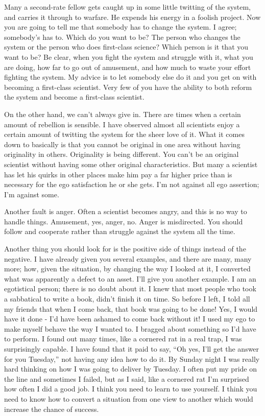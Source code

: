 \documentclass{article}
\begin{document}
Many a second-rate fellow gets caught up in some little twitting of the system, and carries it through to warfare. He expends his energy in a foolish project. Now you are going to tell me that somebody has to change the system. I agree; somebody's has to. Which do you want to be? The person who changes the system or the person who does first-class science? Which person is it that you want to be? Be clear, when you fight the system and struggle with it, what you are doing, how far to go out of amusement, and how much to waste your effort fighting the system. My advice is to let somebody else do it and you get on with becoming a first-class scientist. Very few of you have the ability to both reform the system and become a first-class scientist.

On the other hand, we can't always give in. There are times when a certain amount of rebellion is sensible. I have observed almost all scientists enjoy a certain amount of twitting the system for the sheer love of it. What it comes down to basically is that you cannot be original in one area without having originality in others. Originality is being different. You can't be an original scientist without having some other original characteristics. But many a scientist has let his quirks in other places make him pay a far higher price than is necessary for the ego satisfaction he or she gets. I'm not against all ego assertion; I'm against some.

Another fault is anger. Often a scientist becomes angry, and this is no way to handle things. Amusement, yes, anger, no. Anger is misdirected. You should follow and cooperate rather than struggle against the system all the time.

Another thing you should look for is the positive side of things instead of the negative. I have already given you several examples, and there are many, many more; how, given the situation, by changing the way I looked at it, I converted what was apparently a defect to an asset. I'll give you another example. I am an egotistical person; there is no doubt about it. I knew that most people who took a sabbatical to write a book, didn't finish it on time. So before I left, I told all my friends that when I come back, that book was going to be done! Yes, I would have it done - I'd have been ashamed to come back without it! I used my ego to make myself behave the way I wanted to. I bragged about something so I'd have to perform. I found out many times, like a cornered rat in a real trap, I was surprisingly capable. I have found that it paid to say, ``Oh yes, I'll get the answer for you Tuesday,'' not having any idea how to do it. By Sunday night I was really hard thinking on how I was going to deliver by Tuesday. I often put my pride on the line and sometimes I failed, but as I said, like a cornered rat I'm surprised how often I did a good job. I think you need to learn to use yourself. I think you need to know how to convert a situation from one view to another which would increase the chance of success.
\end{document}
